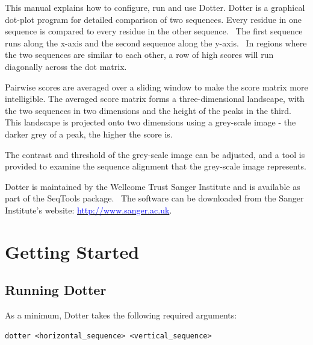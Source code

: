 \documentclass{report}
\newcommand\textstyleInternetlink[1]{\textcolor{blue}{#1}}
\begin{document}
\setcounter{tocdepth}{10}
\renewcommand\contentsname{Contents}
\tableofcontents
{}
{This manual explains how to configure, run and
use Dotter. Dotter is a graphical
dot-plot program for detailed comparison of two sequences.
Every residue in one sequence is compared to every residue
in the other sequence. \ The first sequence runs along the x-axis and
the second sequence along the y-axis. \ In regions where the two
sequences are similar to each other, a row of high scores will run
diagonally across the dot matrix.}

\bigskip

{Pairwise scores are averaged over a sliding window to make the
score matrix more intelligible. The averaged score matrix
forms a three-dimensional landscape, with the two sequences in two
dimensions and the height of the peaks in the third. This landscape is
projected onto two dimensions using a grey-scale image - the darker
grey of a peak, the higher the score is.}

\bigskip

{The contrast and threshold of the grey-scale image can be adjusted, and
a tool is provided to examine the sequence alignment that the
grey-scale image represents.}

\bigskip

{
{Dotter is maintained by the Wellcome Trust
Sanger Institute and is available as part of the SeqTools package.
\ The software can be downloaded from the Sanger
Institute{\textquoteright}s website:}
\href{http://www.sanger.ac.uk/}{\textstyleInternetlink{http://www.sanger.ac.uk}}.
}

{\color[rgb]{0.0,0.27058825,0.5254902}\section[Getting Started]{Getting Started}}
{\color[rgb]{0.30980393,0.5058824,0.7411765}\subsection[Running Dotter]{Running Dotter}}

As a minimum, Dotter takes the following required arguments:

\begin{verbatim}
dotter <horizontal_sequence> <vertical_sequence>
\end{verbatim}
\end{document}
